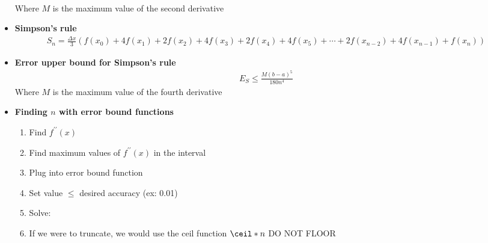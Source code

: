\documentclass{report}
\begin{document}
\begin{itemize}
\begin{align*}
        \end{align*}
        Where $M$ is the maximum value of the second derivative
        \item \textbf{Simpson’s rule}
        \begin{align*}
            S_n = \frac{\Delta x}{3} \left( f(x_0) + 4f(x_1) + 2f(x_2) + 4f(x_3) + 2f(x_4) + 4f(x_5) + \cdots + 2f(x_{n-2}) + 4f(x_{n-1}) + f(x_n) \right)
        \end{align*}
        \item \textbf{Error upper bound for Simpson’s rule}
        \begin{align*}
            E_{S} \leq \frac{M(b-a)^5}{180n^4}
        \end{align*}
        Where $M$ is the maximum value of the fourth derivative
    \item \textbf{Finding $n$ with error bound functions}
        \begin{enumerate}
            \item Find $f^{\prime\prime}(x)$
            \item Find maximum values of $f^{\prime\prime}(x)$ in the interval
            \item Plug into error bound function 
            \item Set value $\leq$ desired accuracy (ex: 0.01)
            \item Solve: 
            \item If we were to truncate, we would use the ceil function $\ceil*{n}$ DO NOT FLOOR
        \end{enumerate}
    \end{itemize}
\end{document}
